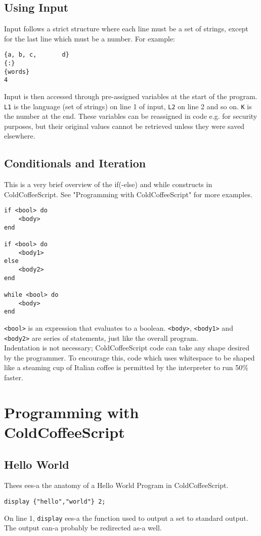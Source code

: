 \documentclass{article}
\begin{document}
\subsection{Using Input}
Input follows a strict structure where each line must be a set of strings, except for the last line which must be a number. For example:
\begin{lstlisting}
{a, b, c,       d}
{:}
{words}
4
\end{lstlisting}
Input is then accessed through pre-assigned variables at the start of the program. \lstinline|L1| is the language (set of strings) on line 1 of input, \lstinline|L2| on line 2 and so on. \lstinline|K| is the number at the end. These variables can be reassigned in code e.g. for security purposes, but their original values cannot be retrieved unless they were saved elsewhere.
\subsection{Conditionals and Iteration}
This is a very brief overview of the if(-else) and while constructs in ColdCoffeeScript. See "Programming with ColdCoffeeScript" for more examples.
\begin{lstlisting}
if <bool> do
    <body>
end

if <bool> do
    <body1>
else
    <body2>
end

while <bool> do
    <body>
end
\end{lstlisting}
\lstinline|<bool>| is an expression that evaluates to a boolean. \lstinline|<body>|, \lstinline|<body1>| and \lstinline|<body2>| are series of statements, just like the overall program. \\
Indentation is not necessary; ColdCoffeeScript code can take any shape desired by the programmer. To encourage this, code which uses whitespace to be shaped like a steaming cup of Italian coffee is permitted by the interpreter to run 50\% faster.
\section{Programming with ColdCoffeeScript}
\subsection{Hello World}
Thees ees-a the anatomy of a Hello World Program in ColdCoffeeScript.
\begin{lstlisting}
display {"hello","world"} 2;
\end{lstlisting}
On line 1, \lstinline|display| ees-a the function used to output a set to standard output. The output can-a probably be redirected as-a well.
\end{document}
